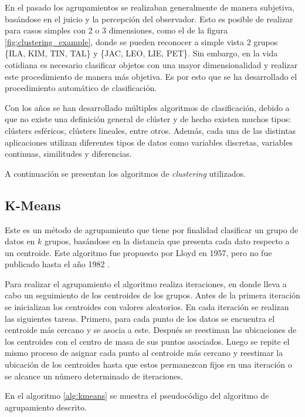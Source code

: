 En el pasado los agrupamientos se realizaban generalmente de manera subjetiva, basándose en el juicio y la percepción del observador. Esto es posible de realizar para casos simples con 2 o 3 dimensiones, como el de la figura \ref{fig:clustering_example}, donde se pueden reconocer a simple vista 2 grupos \{ILA, KIM, TIN, TAL\} y \{JAC, LEO, LIE, PET\}. Sin embargo, en la vida cotidiana es necesario clasificar objetos con una mayor dimensionalidad y realizar este procedimiento de manera más objetiva. Es por esto que se ha desarrollado el procedimiento automático de clasificación.

Con los años se han desarrollado múltiples algoritmos de clasificación, debido a que no existe una definición general de clúster y de hecho existen muchos tipos: clústers esféricos, clústers lineales, entre otros. Además, cada una de las distintas aplicaciones utilizan diferentes tipos de datos como variables discretas, variables continuas, similitudes y diferencias.

A continuación se presentan los algoritmos de \textit{clustering} utilizados.

\subsection{K-Means}

Este es un método de agrupamiento que tiene por finalidad clasificar un grupo de datos en $k$ grupos, basándose en la distancia que presenta cada dato respecto a un centroide. Este algoritmo fue propuesto por Lloyd en 1957, pero no fue publicado hasta el año 1982 \cite{kmeans}.

Para realizar el agrupamiento el algoritmo realiza iteraciones, en donde lleva a cabo un seguimiento de los centroides de los grupos. Antes de la primera iteración se inicializan los centroides con valores aleatorios. En cada iteración se realizan las siguientes tareas. Primero, para cada punto de los datos se encuentra el centroide más cercano y se asocia a este. Después se reestiman las ubicaciones de los centroides con el centro de masa de sus puntos asociados. Luego se repite el mismo proceso de asignar cada punto al centroide más cercano y reestimar la ubicación de los centroides hasta que estos permanezcan fijos en una iteración o se alcance un número determinado de iteraciones. 

En el algoritmo \ref{alg:kmeans} se muestra el pseudocódigo del algoritmo de agrupamiento descrito.

